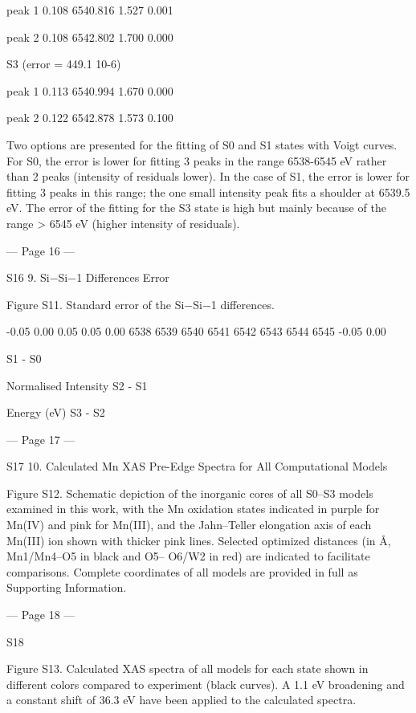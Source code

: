 peak 1           0.108         6540.816       1.527          0.001 
 
peak 2           0.108         6542.802       1.700          0.000 
 
S3 (error = 449.1 10-6) 
 
peak 1            0.113        6540.994       1.670          0.000 
 
peak 2            0.122        6542.878       1.573          0.100 
 
 
Two options are presented for the fitting of S0 and S1 states with Voigt curves. For S0, the error is 
lower for fitting 3 peaks in the range 6538-6545 eV rather than 2 peaks (intensity of residuals 
lower). In the case of S1, the error is lower for fitting 3 peaks in this range; the one small intensity 
peak fits a shoulder at 6539.5 eV. The error of the fitting for the S3 state is high but mainly because 
of the range > 6545 eV (higher intensity of residuals). 
 
 


--- Page 16 ---
 
S16 
9. Si−Si−1  Differences Error 
 
Figure S11. Standard error of the Si−Si−1 differences.  
 
 
-0.05
0.00
0.05
 0.05
0.00
6538 6539 6540 6541 6542 6543 6544 6545
-0.05
0.00
 
 
 
S1 - S0
 
 
 
Normalised Intensity
S2 - S1
 
 
Energy (eV)
S3 - S2


--- Page 17 ---
 
S17 
10. Calculated Mn XAS Pre-Edge Spectra for All Computational Models 
 
 
Figure S12. Schematic depiction of the inorganic cores of all S0–S3 models examined in this work, with the Mn 
oxidation states indicated in purple for Mn(IV) and pink for Mn(III), and the Jahn–Teller elongation axis of each 
Mn(III) ion shown with thicker pink lines. Selected optimized distances (in Å, Mn1/Mn4–O5 in black and O5–
O6/W2 in red) are indicated to facilitate comparisons. Complete coordinates of all models are provided in full 
as Supporting Information.  
 


--- Page 18 ---
 
S18 
 
Figure S13. Calculated XAS spectra of all models for each state shown in different colors compared to 
experiment (black curves). A 1.1 eV broadening and a constant shift of 36.3 eV have been applied to the 
calculated spectra. 
 
